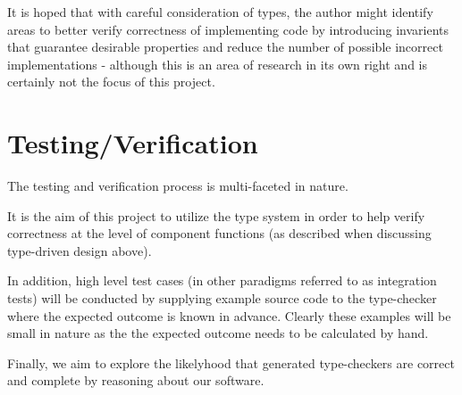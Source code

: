 \documentclass{ProgressReport}[2020/09/15]
\begin{document}
        It is hoped that with careful consideration of types, the
        author might identify areas to better verify correctness of
        implementing code by introducing invarients that guarantee desirable
        properties and reduce the number of possible incorrect
        implementations - although this is an area of research in its
        own right and is certainly not the focus of this project.
        
        \section{Testing/Verification}

        The testing and verification process is multi-faceted in
        nature.

        It is the aim of this project to utilize the type system in
        order to help verify correctness at the level of component
        functions (as described when discussing type-driven design
        above).

        In addition, high level test cases (in other paradigms
        referred to as integration tests) will be conducted by
        supplying example source code to the type-checker where the
        expected outcome is known in advance. Clearly these examples
        will be small in nature as the the expected outcome needs to
        be calculated by hand.

        Finally, we aim to explore the likelyhood that generated
        type-checkers are correct and complete by reasoning about our
        software. 
        	
	
	
	\clearpage
	\printbibliography
	\nocite{*} %
\end{document}
